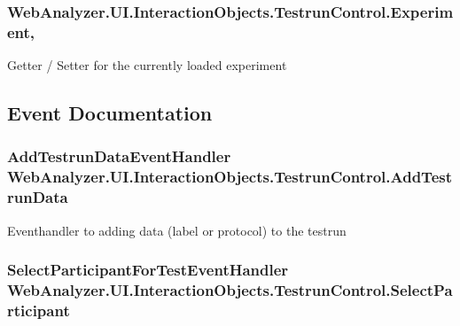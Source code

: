 \subsubsection[{Experiment}]{ Web\+Analyzer.\+U\+I.\+Interaction\+Objects.\+Testrun\+Control.\+Experiment\hspace{0.3cm}{\ttfamily [get]}, {\ttfamily [set]}}\label{class_web_analyzer_1_1_u_i_1_1_interaction_objects_1_1_testrun_control_a050243f65141cdf9dd7aa11125a30c0a}


Getter / Setter for the currently loaded experiment 



\subsection{Event Documentation}
\hypertarget{class_web_analyzer_1_1_u_i_1_1_interaction_objects_1_1_testrun_control_ae68ced3ba48613d9aa1469c128e62419}{}
\subsubsection[{Add\+Testrun\+Data}]{\setlength{\rightskip}{0pt plus 5cm}Add\+Testrun\+Data\+Event\+Handler Web\+Analyzer.\+U\+I.\+Interaction\+Objects.\+Testrun\+Control.\+Add\+Testrun\+Data}\label{class_web_analyzer_1_1_u_i_1_1_interaction_objects_1_1_testrun_control_ae68ced3ba48613d9aa1469c128e62419}


Eventhandler to adding data (label or protocol) to the testrun 

\hypertarget{class_web_analyzer_1_1_u_i_1_1_interaction_objects_1_1_testrun_control_abf256e52c1a039ca329f7c749a9087e4}{}
\subsubsection[{Select\+Participant}]{\setlength{\rightskip}{0pt plus 5cm}Select\+Participant\+For\+Test\+Event\+Handler Web\+Analyzer.\+U\+I.\+Interaction\+Objects.\+Testrun\+Control.\+Select\+Participant}\label{class_web_analyzer_1_1_u_i_1_1_interaction_objects_1_1_testrun_control_abf256e52c1a039ca329f7c749a9087e4}


